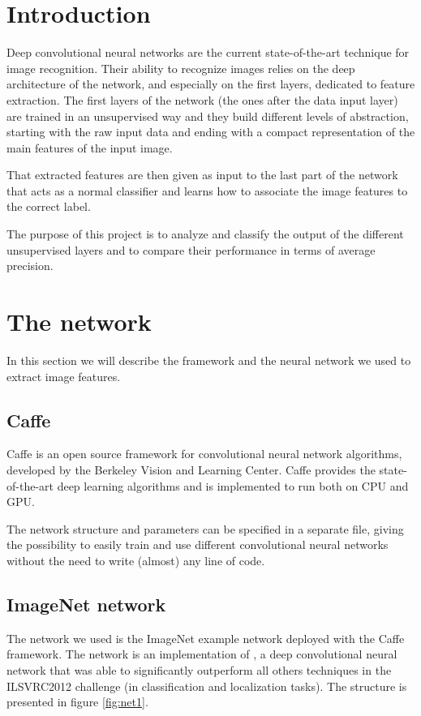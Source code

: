 \section{Introduction}

Deep convolutional neural networks are the current state-of-the-art technique
for image recognition. Their ability to recognize images relies on the deep
architecture of the network, and especially on the first layers, dedicated to
feature extraction. The first layers of the network (the ones after the data
input layer) are trained in an unsupervised way and they build different levels
of abstraction, starting with the raw input data and ending with a compact
representation of the main features of the input image.

That extracted features are then given as input to the last part of the network
that acts as a normal classifier and learns how to associate the image features
to the correct label.

The purpose of this project is to analyze and classify the output of the
different unsupervised layers and to compare their performance in terms of
average precision.

\section{The network}

In this section we will describe the framework and the neural network we used to
extract image features.

\subsection{Caffe}

Caffe \cite{Jia13caffe} is an open source framework for convolutional neural
network algorithms, developed by the Berkeley Vision and Learning Center. Caffe
provides the state-of-the-art deep learning algorithms and is implemented to
run both on CPU and GPU.

The network structure and parameters can be specified in a separate file, giving
the possibility to easily train and use different convolutional neural networks
without the need to write (almost) any line of code.

\subsection{ImageNet network}

The network we used is the ImageNet example network deployed with the Caffe
framework. The network is an implementation of \cite{NIPS2012_4824}, a deep
convolutional neural network that was able to significantly outperform all
others techniques in the ILSVRC2012 challenge (in classification and
localization tasks). The structure is presented in figure \ref{fig:net1}.

